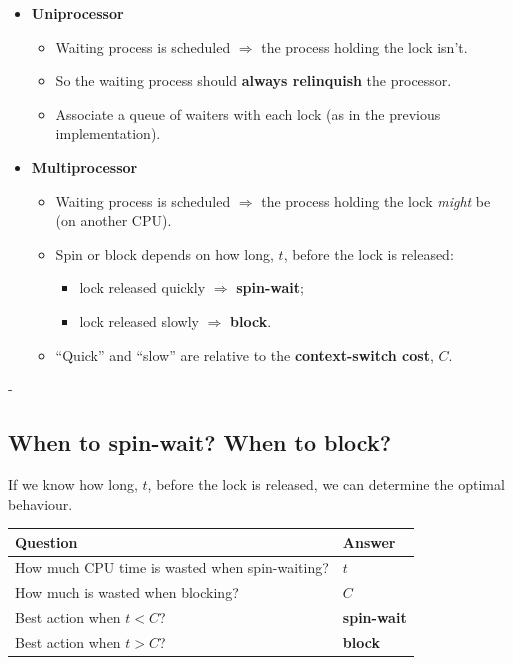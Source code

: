 \documentclass[11pt,a4paper]{article}
\makeatletter
\newcommand{\keepspace}[1]{\par\penalty-100\begingroup
  \setlength{\dimen@}{#1}\dimen@ii\pagegoal\advance\dimen@ii-\pagetotal
  \ifdim\dimen@>\dimen@ii\ifdim\dimen@ii>\z@\vfil\fi\break\fi\endgroup}
\makeatother
\begin{document}
\begin{itemize}
  \item \textbf{Uniprocessor}
    \begin{itemize}
      \item Waiting process is scheduled \(\Rightarrow\) the process holding
            the lock isn't.
      \item So the waiting process should \textbf{always relinquish} the
            processor.
      \item Associate a queue of waiters with each lock (as in the previous
            implementation).
    \end{itemize}
  \item \textbf{Multiprocessor}
    \begin{itemize}
      \item Waiting process is scheduled \(\Rightarrow\) the process holding
            the lock \emph{might} be (on another CPU).
      \item Spin or block depends on how long, \(t\), before the lock is
            released:
        \begin{itemize}
          \item lock released quickly \(\Rightarrow\) \textbf{spin-wait};
          \item lock released slowly \(\Rightarrow\) \textbf{block}.
        \end{itemize}
      \item ``Quick'' and ``slow'' are relative to the
            \textbf{context-switch cost}, \(C\).
    \end{itemize}
\end{itemize}

\keepspace{16\baselineskip}
\subsection{When to spin-wait? When to block?}

If we know how long, \(t\), before the lock is released, we can determine
the optimal behaviour.

\begin{center}
\renewcommand{\arraystretch}{1.2}
\begin{tabular}{@{}ll@{}}
  \toprule
  \textbf{Question} & \textbf{Answer} \\
  \midrule
  How much CPU time is wasted when spin-waiting? & \(t\) \\
  How much is wasted when blocking? & \(C\) \\
  Best action when \(t < C\)? & \textbf{spin-wait} \\
  Best action when \(t > C\)? & \textbf{block} \\
  \bottomrule
\end{tabular}
\end{center}
\end{document}
